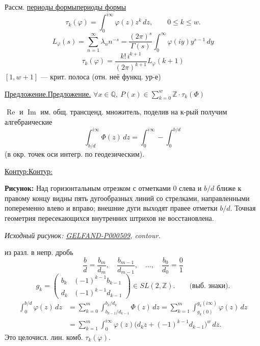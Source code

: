\documentclass[11pt]{article}
\theoremstyle{definition}
\theoremstyle{remark}
\newcommand{\Unclear}[3]{%
  \begingroup\color{orange!70!black}%
  [Unresolved reading #1/#2: #3]\endgroup%
}
\newcommand{\SourceFigure}[3]{%
  \par\begingroup\color{blue!60!black}\textbf{\hyperref[#1:source-page]{Source figure #1/#2}:} #3%
  \par\textit{Consult the authoritative scan at this locator.}\endgroup\par%
}
\renewcommand{\Unclear}[3]{%
  \begingroup\color{orange!65!black}%
  \ifmmode\text{[неясно: #3]}\else[неясно: #3]\fi\endgroup%
}
\renewcommand{\SourceFigure}[3]{%
  \par\begingroup\color{blue!55!black}\textbf{Рисунок:} #3%
  \par{\small\textit{Исходный рисунок: \hyperref[#1:source-page]{#1}, #2.}}%
  \endgroup\par%
}
\let\DiplomaticMathUnderline\underline
\renewcommand{\underline}[1]{\ifmmode\DiplomaticMathUnderline{#1}\else\uline{#1}\fi}
\begin{document}
Рассм. \underline{периоды формы}
\begin{equation*}
\tau_k(\varphi)=\int_0^{i\infty}\varphi(z)z^k\,dz,\qquad 0\leq k\leq w.
\end{equation*}
\begin{equation*}
L_{\varphi}(s)=\sum_{n=1}^{\infty}\lambda_n n^{-s}
=\frac{(2\pi)^s}{\Gamma(s)}\int_0^{\infty}\varphi(iy)y^{s-1}\,dy
\end{equation*}
\begin{equation*}
\tau_k(\varphi)=\frac{k!\,i^{k+1}}{(2\pi)^{k+1}}L_{\varphi}(k+1)
\end{equation*}
$[1,w+1]$ — крит. полоса (отн. неё функц. ур-е)

\underline{Предложение.} $\forall x\in\mathbb Q,\ P(x)\in\displaystyle\sum_{k=0}^{w}\mathbb Z\cdot\tau_k(\Phi)$

$\operatorname{Re}$ и $\operatorname{Im}$ им. общ. трансценд. множитель, поделив на к-рый получим алгебраические
\begin{equation*}
\int_{b/d}^{i\infty}\Phi(z)\,dz
=\int_0^{i\infty}-\int_0^{b/d}
\end{equation*}
(в окр. точек оси интегр. по геодезическим).

\underline{Контур:}
\SourceFigure{GELFAND-P000509}{contour}{Над горизонтальным отрезком с отметками $0$ слева и $b/d$ ближе к правому концу видны пять дугообразных линий со стрелками, направленными попеременно влево и вправо; внешние дуги выходят правее отметки $b/d$. Точная геометрия пересекающихся внутренних штрихов не восстановлена.}

из разл. в непр. дробь
\begin{equation*}
\frac bd=\frac{b_m}{d_m},\quad\frac{b_{m-1}}{d_{m-1}},\quad\ldots,\quad\frac{b_0}{d_0}=\frac01
\end{equation*}
\begin{equation*}
g_k=\begin{pmatrix}
b_k&(-1)^{k-1}b_{k-1}\\
d_k&(-1)^{k-1}d_{k-1}
\end{pmatrix}\in SL(2,\mathbb Z).
\qquad\text{(выб. знаки).}
\end{equation*}
\begin{equation*}
\begin{aligned}
\int_0^{b/d}\varphi(z)\,dz
&=\sum_{k=0}^{m}\int_{b_{k-1}/d_{k-1}}^{b_k/d_k}\Phi(z)\,dz
=\sum_{k=1}^{m}\int_{g_k(0)}^{g_k(i\infty)}\varphi(z)\,dz\\
&=\sum_{k=1}^{m}\int_0^{i\infty}\varphi(z)\bigl(d_kz+(-1)^{k-1}d_{k-1}\bigr)^w\,dz.
\end{aligned}
\end{equation*}
Это целочисл. лин. комб. $\tau_k(\varphi)$.
\Unclear{GELFAND-P000509}{decomposition-lower-index}{В первой сумме нижний индекс $k=0$, в двух следующих $k=1$; эти записи сохранены.}
\end{document}
